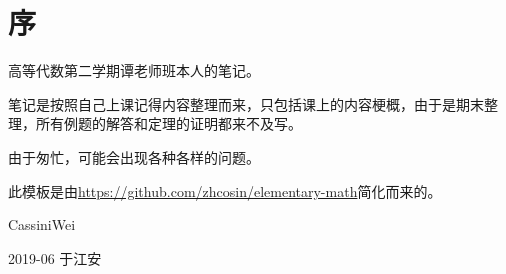 \documentclass[UTF8]{ctexbook}
\title{\kaishu{高等代数-2笔记整理}}
\author{CassiniWei}
\date{}
\begin{document}
\maketitle
\chapter*{序}
\thispagestyle{empty}
高等代数第二学期谭老师班本人的笔记。\par
笔记是按照自己上课记得内容整理而来，只包括课上的内容梗概，由于是期末整理，所有例题的解答和定理的证明都来不及写。
\par
由于匆忙，可能会出现各种各样的问题。
\par
此模板是由\hyperref[zhcosin/elementary-math]{https://github.com/zhcosin/elementary-math}简化而来的。

\vspace{1.5cm}

\hfill CassiniWei \hspace{3.5em}

\hfill 2019-06 于江安 \hspace{1.5em}

\tableofcontents
%


\mainmatter





\end{document}
